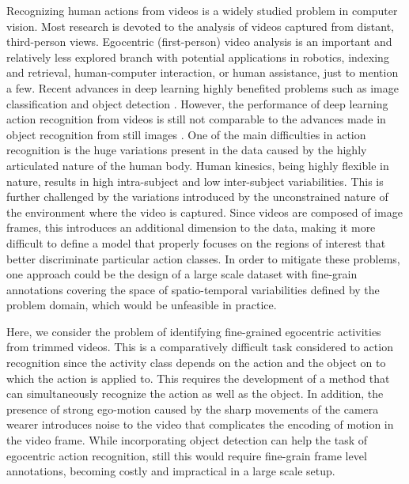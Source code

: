 \documentclass[10pt,twocolumn,letterpaper]{article}
\begin{document}
Recognizing human actions from videos is a widely studied  problem in computer vision. Most research is devoted to the analysis of videos captured from distant, third-person views. Egocentric (first-person) video analysis is an important and relatively less explored branch with potential applications in robotics, indexing and retrieval, human-computer interaction, or human assistance, just to mention a few. Recent advances in deep learning highly benefited problems such as image classification \cite{he16residual, xie2017aggregated} and object detection \cite{liu2016ssd, he2017mask}. However, the performance of deep learning action recognition from videos is still not comparable to the advances made in object recognition from still images \cite{he16residual}. One of the main difficulties in action recognition is the huge variations present in the data caused by the highly articulated nature of the human body. Human kinesics, being highly flexible in nature, results in high intra-subject and low inter-subject variabilities. This is further challenged by the variations introduced by the unconstrained nature of the environment where the video is captured. Since videos are composed of image frames, this introduces an additional dimension to the data, making it more difficult to define a model that properly focuses on the regions of interest that better discriminate particular action classes. In order to mitigate these problems, one approach could be the design of a large scale dataset with fine-grain annotations covering the space of spatio-temporal variabilities defined by the problem domain, which would be unfeasible in practice.

Here, we consider the problem of identifying fine-grained egocentric activities from trimmed videos. This is a comparatively difficult task considered to action recognition since the activity class depends on the action and the object on to which the action is applied to. This requires the development of a method that can simultaneously recognize the action as well as the object. In addition, the presence of strong ego-motion caused by the sharp movements of the camera wearer introduces noise to the video that complicates the encoding of motion in the video frame. While incorporating object detection can help the task of egocentric action recognition, still this would require fine-grain frame level annotations, becoming costly and impractical in a large scale setup. 
	
\end{document}
